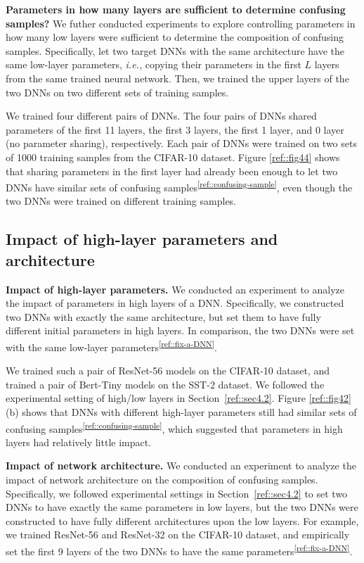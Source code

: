 \documentclass[10pt,twocolumn,letterpaper]{article}
\begin{document}
\textbf{Parameters in how many layers are sufficient to determine confusing samples?}
We futher conducted experiments to explore controlling parameters in how many low layers were sufficient to determine the composition of confusing samples. Specifically, let two target DNNs with the same architecture have the same low-layer parameters, \emph{i.e.,} copying their parameters in the first $L$ layers from the same trained neural network. Then, we trained the upper layers of the two DNNs on two different sets of training samples.

We trained four different pairs of DNNs. The four pairs of DNNs shared parameters of the first 11 layers, the first 3 layers, the first 1 layer, and 0 layer (no parameter sharing), respectively. Each pair of DNNs were trained on two sets of 1000 training samples from the CIFAR-10 dataset. Figure \ref{ref::fig44} shows that sharing parameters in the first layer had already been enough to let two DNNs have similar sets of confusing samples\textsuperscript{\ref{ref::confusing-sample}}, even though the two DNNs were trained on different training samples.

\subsection{Impact of high-layer parameters and architecture}\label{ref::sec4.3}
\textbf{Impact of high-layer parameters.} We conducted an experiment to analyze the impact of parameters in high layers of a DNN. Specifically, we constructed two DNNs with exactly the same architecture, but set them to have fully different initial parameters in high layers. In comparison, the two DNNs were set with the same low-layer parameters\textsuperscript{\ref{ref::fix-a-DNN}}.


We trained such a pair of ResNet-56 models on the CIFAR-10 dataset, and trained a pair of Bert-Tiny models on the SST-2 dataset. We followed the experimental setting of high/low layers in Section~\ref{ref::sec4.2}. Figure \ref{ref::fig42}(b) shows that DNNs with different high-layer parameters still had similar sets of confusing samples\textsuperscript{\ref{ref::confusing-sample}}, which suggested that parameters in high layers had relatively little impact.


\textbf{Impact of network architecture.}
We conducted an experiment to analyze the impact of network architecture on the composition of confusing samples. Specifically, we followed experimental settings in Section~\ref{ref::sec4.2} to set two DNNs to have exactly the same parameters in low layers, but the two DNNs were constructed to have fully different architectures upon the low layers. For example, we trained ResNet-56 and ResNet-32 on the CIFAR-10 dataset,
and empirically set the first 9 layers of the two DNNs to have the same parameters\textsuperscript{\ref{ref::fix-a-DNN}}.
\end{document}
